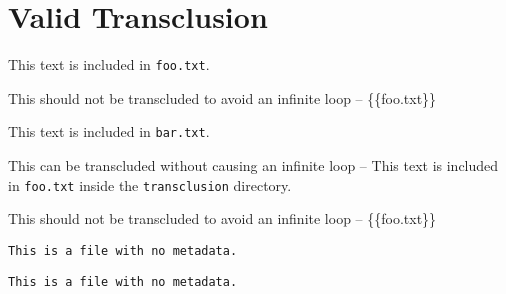 
\def\mytitle{MultiMarkdown Transclusion Test}


\part{Valid Transclusion}
\label{validtransclusion}

This text is included in \texttt{foo.txt}.

This should not be transcluded to avoid an infinite loop -- \{\{foo.txt\}\}

This text is included in \texttt{bar.txt}.

This can be transcluded without causing an infinite loop -- This text is included in \texttt{foo.txt} inside the \texttt{transclusion} directory.

This should not be transcluded to avoid an infinite loop -- \{\{foo.txt\}\}

\begin{verbatim}
This is a file with no metadata.
\end{verbatim}

\begin{verbatim}
This is a file with no metadata.
\end{verbatim}




